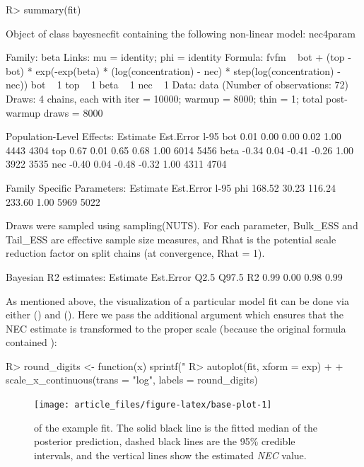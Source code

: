 \documentclass[
  shortnames]{jss}
\begin{document}
\begin{CodeChunk}
\begin{CodeInput}
R> summary(fit)
\end{CodeInput}
\begin{CodeOutput}
Object of class bayesnecfit containing the following non-linear model: nec4param

 Family: beta 
  Links: mu = identity; phi = identity 
Formula: fvfm ~ bot + (top - bot) * exp(-exp(beta) * (log(concentration) - nec) * step(log(concentration) - nec)) 
         bot ~ 1
         top ~ 1
         beta ~ 1
         nec ~ 1
   Data: data (Number of observations: 72) 
  Draws: 4 chains, each with iter = 10000; warmup = 8000; thin = 1;
         total post-warmup draws = 8000

Population-Level Effects: 
     Estimate Est.Error l-95%
bot      0.01      0.00     0.00     0.02 1.00     4443     4304
top      0.67      0.01     0.65     0.68 1.00     6014     5456
beta    -0.34      0.04    -0.41    -0.26 1.00     3922     3535
nec     -0.40      0.04    -0.48    -0.32 1.00     4311     4704

Family Specific Parameters: 
    Estimate Est.Error l-95%
phi   168.52     30.23   116.24   233.60 1.00     5969     5022

Draws were sampled using sampling(NUTS). For each parameter, Bulk_ESS
and Tail_ESS are effective sample size measures, and Rhat is the potential
scale reduction factor on split chains (at convergence, Rhat = 1).


Bayesian R2 estimates:
   Estimate Est.Error Q2.5 Q97.5
R2     0.99      0.00 0.98  0.99
\end{CodeOutput}
\end{CodeChunk}

As mentioned above, the visualization of a particular model fit can be done via either   () and  \citep{ggplot} (). Here we pass the additional argument  which ensures that the NEC estimate is transformed to the proper scale (because the original formula contained ):

\begin{CodeChunk}
\begin{CodeInput}
R> round_digits <- function(x) sprintf("%
R> autoplot(fit, xform = exp) +
+   scale_x_continuous(trans = "log", labels = round_digits)
\end{CodeInput}
\begin{figure}[!ht]

{\centering \texttt{[image: article\_files/figure-latex/base-plot-1]} 

}

\caption{  of the example fit. The solid black line is the fitted median of the posterior prediction, dashed black lines are the 95\% credible intervals, and the vertical lines show the estimated \textit{NEC} value.}\label{fig:base-plot}
\end{figure}
\end{CodeChunk}
\end{document}
